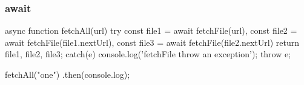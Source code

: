 \begin{frame}[fragile] \frametitle{await}
\begin{CodeBox}{}
async function fetchAll(url) {
  try {
    const file1 = await fetchFile(url),
    const file2 = await fetchFile(file1.nextUrl),
    const file3 = await fetchFile(file2.nextUrl)
    return {file1, file2, file3};
  } catch(e) {
    console.log('fetchFile throw an exception');
    throw e;
  }
}

fetchAll("one")
.then(console.log);
\end{CodeBox}
\end{frame}

